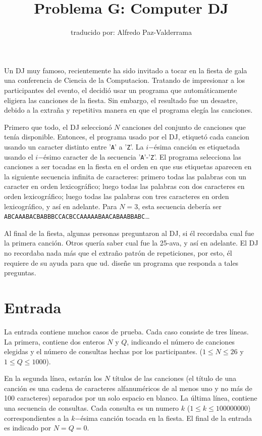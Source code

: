 \documentclass[a4paper,12pt]{article}
\title{Problema G: Computer DJ}
\author{traducido por: Alfredo Paz-Valderrama}
\date{}
\begin{document}
\maketitle

 Un DJ muy famoso, recientemente ha sido invitado a tocar en
la fiesta de gala una conferencia de Ciencia de la
Computacion. Tratando de impresionar a los participantes del
evento, el decidió usar un programa que automáticamente
eligiera las canciones de la fiesta. Sin embargo, el resultado
fue un desastre, debido a la extraña y repetitiva manera en
que el programa elegía las canciones.

 Primero que todo, el DJ seleccionó $N$ canciones del conjunto
de canciones que tenía disponible. Entonces, el programa usado por el
DJ, etiquetó cada cancion usando un caracter
distinto entre ’\verb|A|’ a ’\verb|Z|’. La $i$−ésima canción es etiquetada
usando el $i$−ésimo caracter de la secuencia ’\verb|A|’-’\verb|Z|’. El
programa selecciona las canciones a ser tocadas en la fiesta
en el orden en que sus etiquetas aparecen en la siguiente
secuencia infinita de caracteres: primero todas las palabras
con un caracter en orden lexicográfico; luego todas las
palabras con dos caracteres en orden lexicográfico; luego
todas las palabras con tres caracteres en orden lexicográfico,
y así en adelante. Para $N = 3$, esta secuencia debería ser 
\verb|ABCAAABACBABBBCCACBCCAAAAABAACABAABBABC|\ldots

 Al final de la fiesta, algunas personas preguntaron al DJ, si
él recordaba cual fue la primera canción. Otros quería saber cual fue 
la 25-ava, y así en adelante. El DJ no recordaba nada más
que el extraño patrón de repeticiones, por esto, él requiere de
su ayuda para que ud. diseñe un programa que responda a tales
preguntas.


\section*{Entrada}
 La entrada contiene muchos casos de prueba. Cada caso
consiste de tres líneas. La primera, contiene dos enteros $N$ y
$Q$, indicando el número de canciones elegidas y el número de
consultas hechas por los participantes. ($1 \leq N \leq 26$
y $1 \leq Q \leq 1000$).

En la segunda línea, estarán los $N$ títulos de las canciones
(el título de una canción es una cadena de caracteres alfanuméricos de al menos uno y no más de 100 caracteres) separados por un solo
espacio en blanco. La última línea, contiene una secuencia de
consultas. Cada consulta es un numero $k$
($1 ≤ k ≤ 100000000$) correspondientes a la $k$−ésima
canción tocada en la fiesta. El final de la entrada es indicado
por $N = Q = 0$.
 
\end{document}
